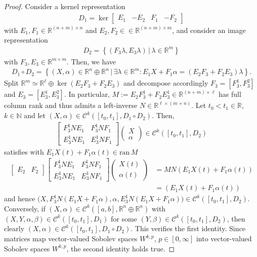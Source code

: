 \documentclass[preprint,12pt]{elsarticle}
\theoremstyle{definition}
\newcommand{\set}[1]{\left\lbrace #1\right\rbrace}
\begin{document}
\begin{proof}
Consider a kernel representation
\begin{align*}
D_1 = \ker\begin{bmatrix}
E_1 & -E_2 & F_1 & -F_2
\end{bmatrix}
\end{align*}
with $E_1,F_1\in\mathbb{R}^{(n+m)\times n}$ and $E_2,F_2\in\in\mathbb{R}^{(n+m)\times m}$, and consider an image representation
\begin{align*}
D_2 = \set{(F_3\lambda,E_3\lambda)\,\big\vert\,\lambda\in\mathbb{R}^m}
\end{align*}
with $F_3,E_3\in\mathbb{R}^{m\times m}$. Then, we have
\begin{align*}
D_1\circ D_2 = \set{(X,\alpha)\in\mathbb{R}^n\oplus\mathbb{R}^n\,\big\vert\,\exists\lambda\in\mathbb{R}^m: E_1X+F_1\alpha = (E_2F_3+F_2E_3)\lambda}.
\end{align*}
Split $\mathbb{R}^m\simeq\mathbb{R}^\ell\oplus\ker(E_2F_3+F_2E_3)$ and decompose accordingly $F_3 = [F_3^1,F_3^2]$ and $E_3 = [E_3^1,E_3^2]$. In particular, $M := E_2F_3^1+F_2E_3^1\in\mathbb{R}^{(n+m)\times \ell}$ has full column rank and thus admits a left-inverse $N\in\mathbb{R}^{\ell\times (m+n)}$. Let $t_0<t_1\in\mathbb{R}$, $k\in\mathbb{N}$ and let $(X,\alpha)\in\mathcal{C}^k([t_0,t_1], D_1\circ D_2)$. Then,
\begin{align*}
\begin{bmatrix}
F_3^1NE_1 & F_3^1NF_1\\
E_3^1NE_1 & E_3^1NF_1
\end{bmatrix}\begin{pmatrix}
X\\\alpha
\end{pmatrix}\in\mathcal{C}^k([t_0,t_1], D_2)
\end{align*}
satisfies with $E_1X(t)+F_1\alpha(t)\in\mathrm{ran}\,M$
\begin{align*}
\begin{bmatrix}
E_2 & F_2
\end{bmatrix}\begin{bmatrix}
F_3^1NE_1 & F_3^1NF_1\\
E_3^1NE_1 & E_3^1NF_1
\end{bmatrix}\begin{pmatrix}
X(t)\\\alpha(t)
\end{pmatrix} & = MN(E_1X(t) + F_1\alpha(t))\\
& = (E_1X(t) + F_1\alpha(t))
\end{align*}
and hence $\big(X,F_3^1N(E_1X+F_1\alpha),\alpha,E_3^1N(E_1X+F_1\alpha)\big)\in \mathcal{C}^k([t_0,t_1], D_2)$. Conversely, if $(X,\alpha)\in\mathcal{C}^k([a,b],\mathbb{R}^n\oplus\mathbb{R}^n)$ with $(X,Y,\alpha,\beta)\in\mathcal{C}^k([t_0,t_1],D_1)$ for some $(Y,\beta)\in\mathcal{C}^k([t_0,t_1],D_2)$, then clearly $(X,\alpha)\in\mathcal{C}^k([t_0,t_1], D_1\circ D_2)$. This verifies the first identity. Since matrices map vector-valued Sobolev spaces $W^{k,p}$, $p\in[0,\infty]$ into vector-valued Sobolev spaces $W^{k,p}$, the second identity holds true.
\end{proof}
\end{document}
